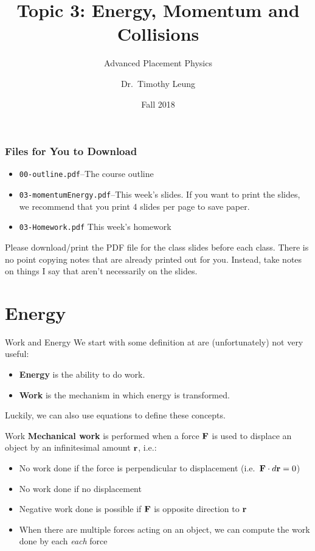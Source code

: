 \documentclass[12pt,compress,aspectratio=169]{beamer}
\title{Topic 3: Energy, Momentum and Collisions}
\subtitle{Advanced Placement Physics}
\author[TML]{Dr.\ Timothy Leung}
\institute{Olympiads School}
\date{Fall 2018}
\newcommand{\mb}[1]{\ensuremath\mathbf{#1}}
\newcommand{\eq}[2]{\vspace{#1}{\Large\begin{displaymath}#2\end{displaymath}}}
\begin{document}
\begin{frame}
  \maketitle
\end{frame}

\begin{frame}
  \frametitle{Files for You to Download}
  \begin{itemize}
  \item\texttt{00-outline.pdf}--The course outline
  \item\texttt{03-momentumEnergy.pdf}--This week's slides. If you want to
    print the slides, we recommend that you print 4 slides per page to save
    paper.
  \item\texttt{03-Homework.pdf} This week's homework
  \end{itemize}
  Please download/print the PDF file for the class slides before each class.
  There is no point copying notes that are already printed out for you.
  Instead, take notes on things I say that aren't necessarily on the slides.
\end{frame}



\section{Energy}

\begin{frame}{Work and Energy}
  We start with some definition at are (unfortunately) not very useful:
  \begin{itemize}
    \item \textbf{Energy} is the ability to do work.
    \item \textbf{Work} is the mechanism in which energy is transformed.
  \end{itemize}
  Luckily, we can also use equations to define these concepts.
\end{frame}


\begin{frame}{Work}
  \textbf{Mechanical work} is performed when a force $\mb{F}$ is used to
  displace an object by an infinitesimal amount $\mb{r}$, i.e.:

  \eq{-.2in}{
    \boxed{W=\int_{r_1}^{r_2}\mb{F}(r)\cdot d\mb{r}}
  }

  \begin{itemize}
  \item No work done if the force is perpendicular to displacement
    (i.e.\ $\mb{F}\cdot d\mb{r}=0$)
  \item No work done if no displacement
  \item Negative work done is possible if $\mb{F}$ is opposite direction to
    $\mb{r}$
  \item When there are multiple forces acting on an object, we can compute the
    work done by each \emph{each} force
  \end{itemize}
\end{frame}
\end{document}
